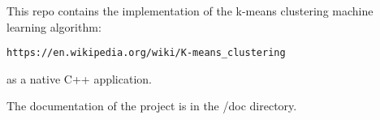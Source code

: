 This repo contains the implementation of the k-\/means clustering machine learning algorithm\+:

{\tt https\+://en.\+wikipedia.\+org/wiki/\+K-\/means\+\_\+clustering}

as a native C++ application.

The documentation of the project is in the /doc directory. 